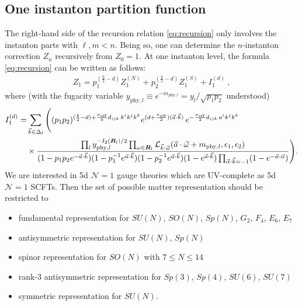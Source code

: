 \documentclass[letterpaper, 11pt]{article}
\newcommand{\nn}{\nonumber}
\def\CL{{\cal L}}
\def\a{\alpha}
\def\e{\epsilon}
\def\k{\kappa}
\def\w{\omega}
\begin{document}
 \subsection{One instanton partition function}
The right-hand side of the recursion relation \eqref{eq:recursion} only involves the instanton parts with $\ell , m < n$. Being so, one can determine the $n$-instanton correction $Z_n$ recursively from $Z_0 = 1$. 
At one instanton level, the formula \eqref{eq:recursion} can be written as follows:
\begin{align}
  \label{eq:1inst}
  Z_1 = p_1^{(\frac{b}{2}-d)}Z^{(N)}_{1}  + p_2^{(\frac{b}{2}-d)}  Z^{(S)}_1  + I_1^{(d)} \ , 
 \end{align}
 where  (with the fugacity variable $y_{\text{phy},l} \equiv e^{-m_{\text{phy},l}} = y_l / \sqrt{p_1p_2}$ understood)
 \begin{align}
  I_1^{(d)} = &\sum_{\vec{k} \in \Delta_l}  \Bigg( 
     (p_1p_2)^{(\frac{b}{2}-d )  +\frac{\k_\text{eff}}{6}d_{ijk}\,k^ik^jk^k} e^{(d+\frac{\k_\text{eff}}{2})(\vec{a}\cdot\vec{k})}\,
    e^{-\frac{\k_\text{eff}}{2}d_{ijk}\,a^ik^jk^k}  \\& 
  \times \frac{\prod_{l} y_{\text{phy},l}^{-I_2(\boldsymbol{R}_l)/2} \prod_{\w \in \boldsymbol{R}_l} \CL_{\vec{k}\cdot\vec{\w}}(\vec{a}\cdot \vec{\w} + m_{\text{phy},l}, \e_1,\e_2)}{ (1-p_1p_2 e^{-\vec{a} \cdot \vec{k} })(1-p_1^{-1} e^{\vec{a} \cdot \vec{k} })(1-p_2^{-1} e^{\vec{a} \cdot \vec{k} })(1-e^{\vec{a} \cdot \vec{k} })\prod_{\vec{\a} \cdot \vec{k} = -1}(1-e^{-\vec{a}\cdot\vec{\alpha}})}
    \Bigg). \nn
\end{align}
We are interested in 5d $\mathcal{N}=1$ gauge theories which are UV-complete as 5d $\mathcal{N}=1$ SCFTs. Then the set of possible matter representation should be restricted to \cite{Jefferson:2017ahm}
\begin{itemize}\setlength\itemsep{-0.3em}
  \item fundamental representation for $SU(N)$, $SO(N)$, $Sp(N)$, $G_2$, $F_4$, $E_6$, $E_7$
  \item antisymmetric representation for $SU(N)$, $Sp(N)$
  \item spinor representation for $SO(N)$ with $7 \leq N \leq 14$
  \item rank-3 antisymmetric representation for $Sp(3)$, $Sp(4)$, $SU(6)$, $SU(7)$
  \item symmetric representation for $SU(N)$.
\end{itemize}
\end{document}
